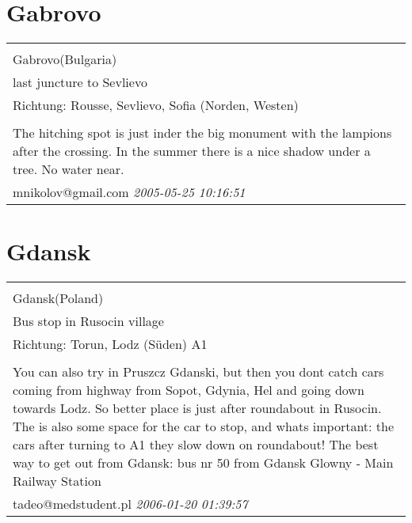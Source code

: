 \documentclass[a4paper,12pt]{article}
\begin{document}
\section{Gabrovo}
\begin{tabular}{|p{13cm}|}
\hline\\
Gabrovo(Bulgaria)\\
last juncture to Sevlievo\\
Richtung: Rousse, Sevlievo, Sofia (Norden, Westen) \\
\hline\\
The hitching spot is just inder the big monument with the lampions after the crossing. In the summer there is a nice shadow under a tree. No water near. \\
mnikolov@gmail.com \textit{ 2005-05-25 10:16:51 }\\\hline
\end{tabular}


\section{Gdansk}
\begin{tabular}{|p{13cm}|}
\hline\\
Gdansk(Poland)\\
Bus stop in Rusocin village\\
Richtung: Torun, Lodz (Süden) A1 \\
\hline\\
You can also try in Pruszcz Gdanski, but then you dont catch cars coming from highway from Sopot, Gdynia, Hel and going down towards Lodz. So better place is just after roundabout in Rusocin. The is also some space for the car to stop, and whats important: the cars after turning to A1 they slow down on roundabout! The best way to get out from Gdansk: bus nr 50 from Gdansk Glowny - Main Railway Station \\
tadeo@medstudent.pl \textit{ 2006-01-20 01:39:57 }\\\hline
\end{tabular}
\end{document}
